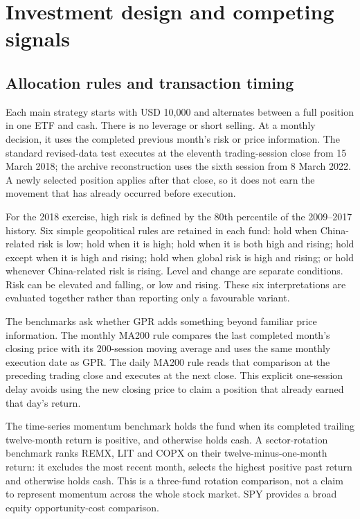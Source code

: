 \section{Investment design and competing signals}
\subsection{Allocation rules and transaction timing}

Each main strategy starts with USD 10,000 and alternates between a full position in one ETF and cash. There is no leverage or short selling. At a monthly decision, it uses the completed previous month's risk or price information. The standard revised-data test executes at the eleventh trading-session close from 15 March 2018; the archive reconstruction uses the sixth session from 8 March 2022. A newly selected position applies after that close, so it does not earn the movement that has already occurred before execution.

For the 2018 exercise, high risk is defined by the 80th percentile of the 2009–2017 history. Six simple geopolitical rules are retained in each fund: hold when China-related risk is low; hold when it is high; hold when it is both high and rising; hold except when it is high and rising; hold when global risk is high and rising; or hold whenever China-related risk is rising. Level and change are separate conditions. Risk can be elevated and falling, or low and rising. These six interpretations are evaluated together rather than reporting only a favourable variant.

The benchmarks ask whether GPR adds something beyond familiar price information. The monthly MA200 rule compares the last completed month's closing price with its 200-session moving average and uses the same monthly execution date as GPR. The daily MA200 rule reads that comparison at the preceding trading close and executes at the next close. This explicit one-session delay avoids using the new closing price to claim a position that already earned that day's return.

The time-series momentum benchmark holds the fund when its completed trailing twelve-month return is positive, and otherwise holds cash. A sector-rotation benchmark ranks REMX, LIT and COPX on their twelve-minus-one-month return: it excludes the most recent month, selects the highest positive past return and otherwise holds cash. This is a three-fund rotation comparison, not a claim to represent momentum across the whole stock market. SPY provides a broad equity opportunity-cost comparison.

